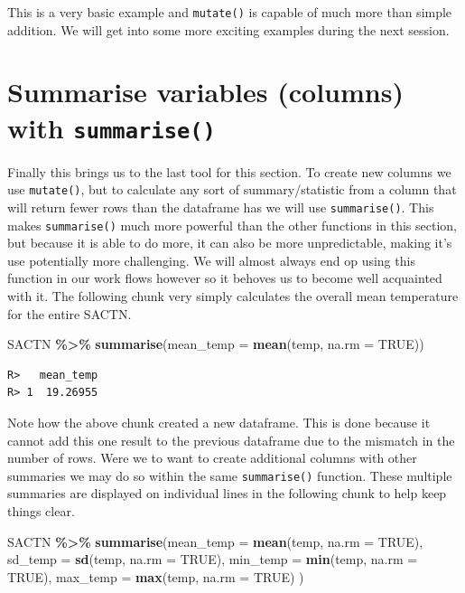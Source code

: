 \documentclass[
]{book}
\newenvironment{Shaded}{\begin{snugshade}}{\end{snugshade}}
\newcommand{\DataTypeTok}[1]{\textcolor[rgb]{0.13,0.29,0.53}{#1}}
\newcommand{\KeywordTok}[1]{\textcolor[rgb]{0.13,0.29,0.53}{\textbf{#1}}}
\newcommand{\NormalTok}[1]{#1}
\newcommand{\OperatorTok}[1]{\textcolor[rgb]{0.81,0.36,0.00}{\textbf{#1}}}
\newcommand{\OtherTok}[1]{\textcolor[rgb]{0.56,0.35,0.01}{#1}}
\newcommand{\StringTok}[1]{\textcolor[rgb]{0.31,0.60,0.02}{#1}}
\begin{document}
This is a very basic example and \texttt{mutate()} is capable of much more than simple addition. We will get into some more exciting examples during the next session.

\hypertarget{summarise-variables-columns-with-summarise}{%
\section{\texorpdfstring{Summarise variables (columns) with \texttt{summarise()}}{Summarise variables (columns) with summarise()}}\label{summarise-variables-columns-with-summarise}}

Finally this brings us to the last tool for this section. To create new columns we use \texttt{mutate()}, but to calculate any sort of summary/statistic from a column that will return fewer rows than the dataframe has we will use \texttt{summarise()}. This makes \texttt{summarise()} much more powerful than the other functions in this section, but because it is able to do more, it can also be more unpredictable, making it's use potentially more challenging. We will almost always end op using this function in our work flows however so it behoves us to become well acquainted with it. The following chunk very simply calculates the overall mean temperature for the entire SACTN.

\begin{Shaded}
\begin{Highlighting}[]
\NormalTok{SACTN }\OperatorTok{\%>\%}\StringTok{ }
\StringTok{  }\KeywordTok{summarise}\NormalTok{(}\DataTypeTok{mean\_temp =} \KeywordTok{mean}\NormalTok{(temp, }\DataTypeTok{na.rm =} \OtherTok{TRUE}\NormalTok{))}
\end{Highlighting}
\end{Shaded}

\begin{verbatim}
R>   mean_temp
R> 1  19.26955
\end{verbatim}

Note how the above chunk created a new dataframe. This is done because it cannot add this one result to the previous dataframe due to the mismatch in the number of rows. Were we to want to create additional columns with other summaries we may do so within the same \texttt{summarise()} function. These multiple summaries are displayed on individual lines in the following chunk to help keep things clear.

\begin{Shaded}
\begin{Highlighting}[]
\NormalTok{SACTN }\OperatorTok{\%>\%}\StringTok{ }
\StringTok{  }\KeywordTok{summarise}\NormalTok{(}\DataTypeTok{mean\_temp =} \KeywordTok{mean}\NormalTok{(temp, }\DataTypeTok{na.rm =} \OtherTok{TRUE}\NormalTok{),}
            \DataTypeTok{sd\_temp =} \KeywordTok{sd}\NormalTok{(temp, }\DataTypeTok{na.rm =} \OtherTok{TRUE}\NormalTok{),}
            \DataTypeTok{min\_temp =} \KeywordTok{min}\NormalTok{(temp, }\DataTypeTok{na.rm =} \OtherTok{TRUE}\NormalTok{),}
            \DataTypeTok{max\_temp =} \KeywordTok{max}\NormalTok{(temp, }\DataTypeTok{na.rm =} \OtherTok{TRUE}\NormalTok{)}
\NormalTok{            )}
\end{Highlighting}
\end{Shaded}
\end{document}
